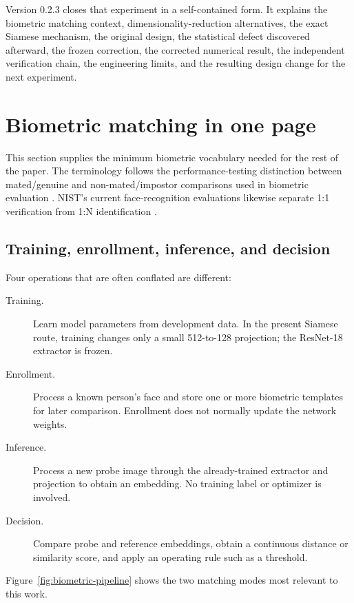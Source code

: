 \documentclass[10pt,a4paper]{article}
\begin{document}
Version 0.2.3 closes that experiment in a self-contained form. It explains the biometric
matching context, dimensionality-reduction alternatives, the exact Siamese mechanism, the
original design, the statistical defect discovered afterward, the frozen correction, the
corrected numerical result, the independent verification chain, the engineering limits, and
the resulting design change for the next experiment.

\section{Biometric matching in one page}\label{sec:biometric-primer}

This section supplies the minimum biometric vocabulary needed for the rest of the paper.
The terminology follows the performance-testing distinction between mated/genuine and
non-mated/impostor comparisons used in biometric evaluation \cite{iso19795}. NIST's current
face-recognition evaluations likewise separate 1:1 verification from 1:N identification
\cite{nistfrte11,nistfrte1n}.

\subsection{Training, enrollment, inference, and decision}

Four operations that are often conflated are different:

\begin{description}
\item[Training.] Learn model parameters from development data. In the present Siamese route,
training changes only a small 512-to-128 projection; the ResNet-18 extractor is frozen.
\item[Enrollment.] Process a known person's face and store one or more biometric templates
for later comparison. Enrollment does not normally update the network weights.
\item[Inference.] Process a new probe image through the already-trained extractor and
projection to obtain an embedding. No training label or optimizer is involved.
\item[Decision.] Compare probe and reference embeddings, obtain a continuous distance or
similarity score, and apply an operating rule such as a threshold.
\end{description}

Figure~\ref{fig:biometric-pipeline} shows the two matching modes most relevant to this work.
\end{document}
